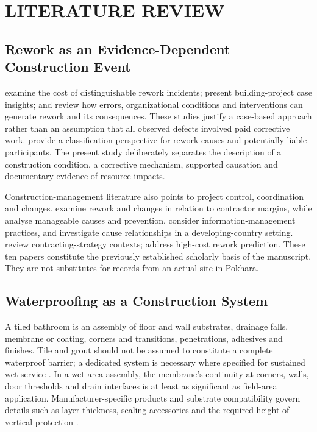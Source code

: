 \chapter{LITERATURE REVIEW}
\section{Rework as an Evidence-Dependent Construction Event}
\textcite{forcada2017} examine the cost of distinguishable rework incidents; \textcite{liu2020} present building-project case insights; and \textcite{love2022} review how errors, organizational conditions and interventions can generate rework and its consequences. These studies justify a case-based approach rather than an assumption that all observed defects involved paid corrective work. \textcite{asadi2023} provide a classification perspective for rework causes and potentially liable participants. The present study deliberately separates the description of a construction condition, a corrective mechanism, supported causation and documentary evidence of resource impacts.

Construction-management literature also points to project control, coordination and changes. \textcite{love2019} examine rework and changes in relation to contractor margins, while \textcite{safapour2019} analyse manageable causes and prevention. \textcite{hwang2019} consider information-management practices, and \textcite{garg2021} investigate cause relationships in a developing-country setting. \textcite{asadi2021} review contracting-strategy contexts; \textcite{mostofi2022} address high-cost rework prediction. These ten papers constitute the previously established scholarly basis of the manuscript. They are not substitutes for records from an actual site in Pokhara.

\section{Waterproofing as a Construction System}
A tiled bathroom is an assembly of floor and wall substrates, drainage falls, membrane or coating, corners and transitions, penetrations, adhesives and finishes. Tile and grout should not be assumed to constitute a complete waterproof barrier; a dedicated system is necessary where specified for sustained wet service \parencite{schluter2026,tcna2023}. In a wet-area assembly, the membrane's continuity at corners, walls, door thresholds and drain interfaces is at least as significant as field-area application. Manufacturer-specific products and substrate compatibility govern details such as layer thickness, sealing accessories and the required height of vertical protection \parencite{laticrete2026}.

